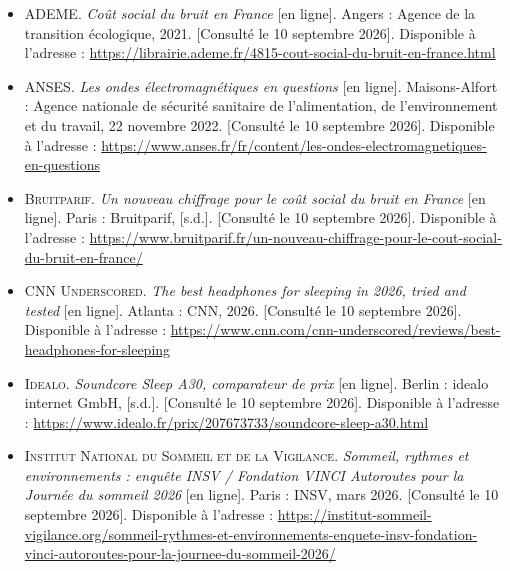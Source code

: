\begin{itemize}\setlength{\itemsep}{0.8em}

  \item \textsc{ADEME}. \textit{Coût social du bruit en France} [en ligne].
        Angers : Agence de la transition écologique, 2021.
        [Consulté le 10 septembre 2026]. Disponible à l'adresse :
        \url{https://librairie.ademe.fr/4815-cout-social-du-bruit-en-france.html}

  \item \textsc{ANSES}. \textit{Les ondes électromagnétiques en questions}
        [en ligne]. Maisons-Alfort : Agence nationale de sécurité sanitaire de
        l'alimentation, de l'environnement et du travail, 22 novembre 2022.
        [Consulté le 10 septembre 2026]. Disponible à l'adresse :
        \url{https://www.anses.fr/fr/content/les-ondes-electromagnetiques-en-questions}

  \item \textsc{Bruitparif}. \textit{Un nouveau chiffrage pour le coût social du
        bruit en France} [en ligne]. Paris : Bruitparif, [s.d.].
        [Consulté le 10 septembre 2026]. Disponible à l'adresse :
        \url{https://www.bruitparif.fr/un-nouveau-chiffrage-pour-le-cout-social-du-bruit-en-france/}

  \item \textsc{CNN Underscored}. \textit{The best headphones for sleeping in
        2026, tried and tested} [en ligne]. Atlanta : CNN, 2026.
        [Consulté le 10 septembre 2026]. Disponible à l'adresse :
        \url{https://www.cnn.com/cnn-underscored/reviews/best-headphones-for-sleeping}

  \item \textsc{Idealo}. \textit{Soundcore Sleep A30, comparateur de prix}
        [en ligne]. Berlin : idealo internet GmbH, [s.d.].
        [Consulté le 10 septembre 2026]. Disponible à l'adresse :
        \url{https://www.idealo.fr/prix/207673733/soundcore-sleep-a30.html}

  \item \textsc{Institut National du Sommeil et de la Vigilance}.
        \textit{Sommeil, rythmes et environnements : enquête INSV / Fondation
        VINCI Autoroutes pour la Journée du sommeil 2026} [en ligne].
        Paris : INSV, mars 2026. [Consulté le 10 septembre 2026].
        Disponible à l'adresse :
        \url{https://institut-sommeil-vigilance.org/sommeil-rythmes-et-environnements-enquete-insv-fondation-vinci-autoroutes-pour-la-journee-du-sommeil-2026/}


\end{itemize}
